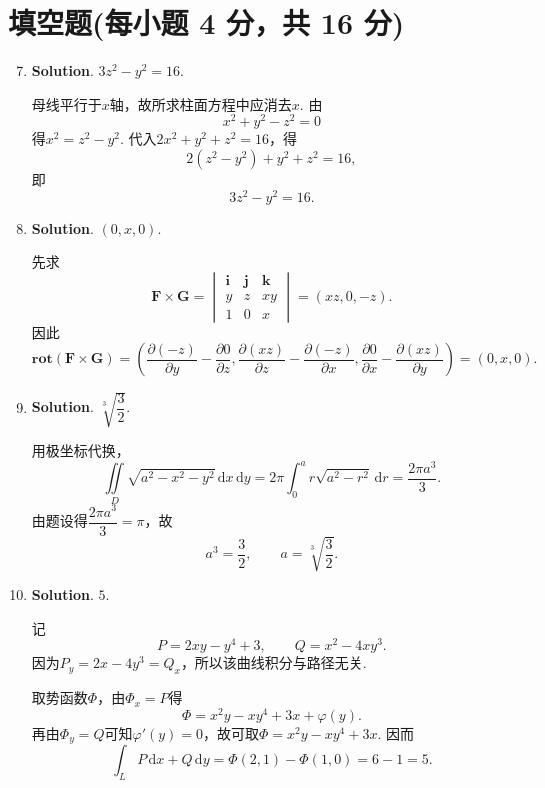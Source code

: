 \documentclass[../main.tex]{subfiles}
\begin{document}
\section{填空题(每小题 4 分，共 16 分)}
\begin{enumerate}
  \setcounter{enumi}{6}
  \item \textbf{Solution}. $3z^{2}-y^{2}=16$.

        母线平行于$x$轴，故所求柱面方程中应消去$x$. 由
        \[
          x^2+y^2-z^2=0
        \]
        得$x^2=z^2-y^2$. 代入$2x^2+y^2+z^2=16$，得
        \[
          2(z^2-y^2)+y^2+z^2=16,
        \]
        即
        \[
          3z^2-y^2=16.
        \]

  \item \textbf{Solution}. $(0,x,0)$.

        先求
        \[
          \boldsymbol{F}\times\boldsymbol{G}
          =
          \begin{vmatrix}
            \boldsymbol{i} & \boldsymbol{j} & \boldsymbol{k} \\
            y              & z              & xy             \\
            1              & 0              & x
          \end{vmatrix}
          =(xz,0,-z).
        \]
        因此
        \[
          \mathbf{rot}(\boldsymbol{F}\times\boldsymbol{G})
          =
          \left(
          \frac{\partial(-z)}{\partial y}-\frac{\partial 0}{\partial z},
          \frac{\partial(xz)}{\partial z}-\frac{\partial(-z)}{\partial x},
          \frac{\partial 0}{\partial x}-\frac{\partial(xz)}{\partial y}
          \right)
          =(0,x,0).
        \]

  \item \textbf{Solution}. $\sqrt[3]{\dfrac{3}{2}}$.

        用极坐标代换，
        \[
          \iint\limits_D\sqrt{a^2-x^2-y^2}\,\mathrm{d}x\,\mathrm{d}y
          =2\pi\int_0^a r\sqrt{a^2-r^2}\,\mathrm{d}r
          =\frac{2\pi a^3}{3}.
        \]
        由题设得$\dfrac{2\pi a^3}{3}=\pi$，故
        \[
          a^3=\frac32,\qquad a=\sqrt[3]{\frac32}.
        \]

  \item \textbf{Solution}. $5$.

        记
        \[
          P=2xy-y^4+3,\qquad Q=x^2-4xy^3.
        \]
        因为$P_y=2x-4y^3=Q_x$，所以该曲线积分与路径无关.

        取势函数$\Phi$，由$\Phi_x=P$得
        \[
          \Phi=x^2y-xy^4+3x+\varphi(y).
        \]
        再由$\Phi_y=Q$可知$\varphi'(y)=0$，故可取$\Phi=x^2y-xy^4+3x$. 因而
        \[
          \int_LP\,\mathrm{d}x+Q\,\mathrm{d}y
          =\Phi(2,1)-\Phi(1,0)=6-1=5.
        \]
\end{enumerate}
\end{document}
